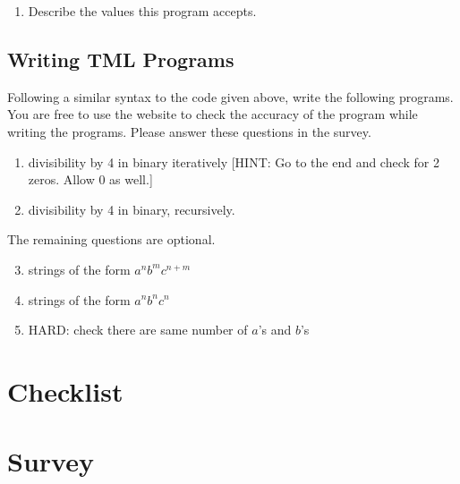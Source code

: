 \begin{appendices}
\begin{enumerate}
\begin{enumerate}
        \item Describe the values this program accepts.
    \end{enumerate}
\end{enumerate}
\newpage

\subsection{Writing TML Programs}

Following a similar syntax to the code given above, write the following programs. You are free to use the website to check the accuracy of the program while writing the programs. Please answer these questions in the survey.
\begin{enumerate}
    \item divisibility by 4 in binary iteratively [HINT: Go to the end and check for 2 zeros. Allow 0 as well.]
    \item divisibility by 4 in binary, recursively.
\end{enumerate}
    
The remaining questions are optional. 
\begin{enumerate}
    \setcounter{enumi}{2}
    \item strings of the form $a^n b^m c^{n+m}$
    \item strings of the form $a^n b^n c^n$
    \item HARD: check there are same number of $a$'s and $b$'s
\end{enumerate}

\section{Checklist}
\section{Survey}



\end{appendices}